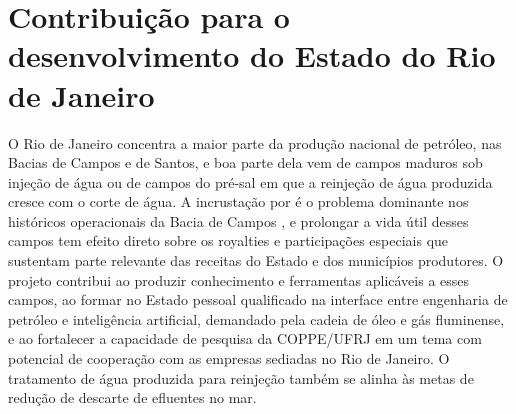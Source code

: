 \documentclass[11pt,a4paper]{article}
\newcommand{\itemedital}[1]{}
\begin{document}
\section{Contribuição para o desenvolvimento do Estado do Rio de Janeiro}\itemedital{2.16 XXII; critério 4}
O Rio de Janeiro concentra a maior parte da produção nacional de petróleo, nas Bacias de
Campos e de Santos, e boa parte dela vem de campos maduros sob injeção de água ou de campos
do pré-sal em que a reinjeção de água produzida cresce com o corte de água. A incrustação por
 é o problema dominante nos históricos operacionais da Bacia de Campos
\cite{rocha2001,bezerra2004}, e prolongar a vida útil desses campos tem efeito direto sobre
os royalties e participações especiais que sustentam parte relevante das receitas do Estado e
dos municípios produtores. O projeto contribui ao produzir conhecimento e ferramentas
aplicáveis a esses campos, ao formar no Estado pessoal qualificado na interface entre
engenharia de petróleo e inteligência artificial, demandado pela cadeia de óleo e gás
fluminense, e ao fortalecer a capacidade de pesquisa da COPPE/UFRJ em um tema com potencial
de cooperação com as empresas sediadas no Rio de Janeiro. O tratamento de água produzida
para reinjeção também se alinha às metas de redução de descarte de efluentes no mar.

\end{document}
